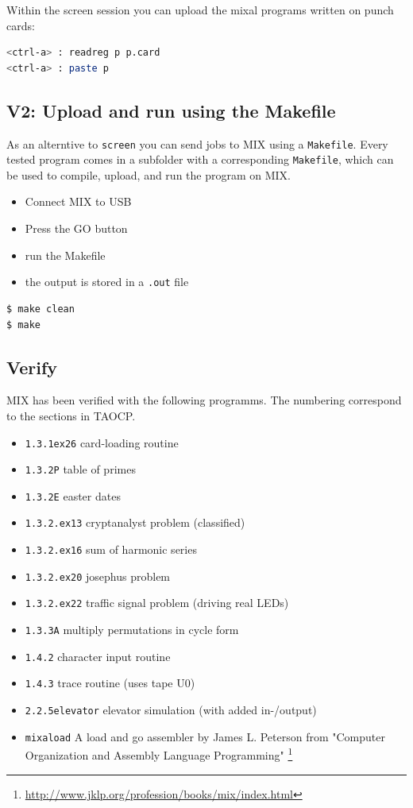 \documentclass[a4paper,ngerman]{scrartcl}
\begin{document}
Within  the screen session you can upload the mixal programs written on punch cards:
\begin{lstlisting}[language=bash,numbers=none,frame=none]
<ctrl-a> : readreg p p.card
<ctrl-a> : paste p
\end{lstlisting}

\subsection{V2: Upload and run using the Makefile}
As an alterntive to \lstinline|screen| you can send jobs to MIX using a \lstinline|Makefile|. Every tested program comes in a subfolder with a corresponding \lstinline|Makefile|, which can be used to compile, upload, and run the program on MIX.

\begin{itemize}
	\item Connect MIX to USB
	\item Press the GO button
	\item run the Makefile
	\item the output is stored in a \lstinline|.out| file
\end{itemize}

\begin{lstlisting}[numbers=none,frame=none]
$ make clean
$ make
\end{lstlisting}


\subsection{Verify}

MIX has been verified with the following programms. The numbering correspond to the sections in TAOCP.
\begin{itemize}	
\item \lstinline|1.3.1ex26| card-loading routine
\item \lstinline|1.3.2P| table of primes
\item \lstinline|1.3.2E| easter dates
\item \lstinline|1.3.2.ex13| cryptanalyst problem (classified)
\item \lstinline|1.3.2.ex16| sum of harmonic series
\item \lstinline|1.3.2.ex20| josephus problem
\item \lstinline|1.3.2.ex22| traffic signal problem (driving real LEDs)
\item \lstinline|1.3.3A| multiply permutations in cycle form
\item \lstinline|1.4.2|  character input routine
\item \lstinline|1.4.3|  trace routine (uses tape U0)
\item \lstinline|2.2.5elevator| elevator simulation (with added in-/output)
\item \lstinline|mixaload| A load and go assembler by James L. Peterson from "Computer Organization and Assembly Language Programming" \footnote{\href{http://www.jklp.org/profession/books/mix/index.html}{http://www.jklp.org/profession/books/mix/index.html}}

\end{itemize}
\end{document}
